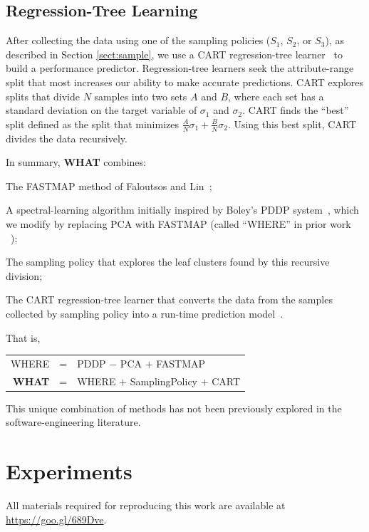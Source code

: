 \documentclass{newsig}
\newcommand{\what}{{\bf WHAT }}
\begin{document}
\subsection{Regression-Tree Learning}
After collecting the data using one of the sampling policies ($S_1$, $S_2$, or $S_3$), as described in Section \ref{sect:sample}, we  use a CART regression-tree learner~\cite{breiman1984} to build a performance predictor. Regression-tree learners seek the attribute-range split that most increases
our ability to make accurate predictions.
CART explores splits that divide $N$ samples  into two sets  $A$ and $B$, where each set  has a  standard deviation on the target variable of $\sigma_1$ and  $\sigma_2$.
CART finds the ``best'' split defined as the split that minimizes $\frac{A}{N}\sigma_1 + \frac{B}{N}\sigma_2$.
Using this best split, CART divides the data recursively.

In summary, \what  combines:
\begin{compactitem}
\item
The FASTMAP method of Faloutsos and Lin~\cite{Faloutsos1995};

\item A spectral-learning algorithm initially   inspired by    Boley's PDDP system~\cite{boley98}, which we modify
by replacing  PCA with FASTMAP (called
``WHERE'' in prior work ~\cite{me12d});

\item
The sampling policy that explores the leaf clusters found by this recursive division;

\item 
The CART regression-tree learner that converts the data from the samples collected by sampling policy 
into a run-time prediction model~\cite{breiman1984}.
\end{compactitem}
That is,
\begin{center}
\begin{tabular}{rcl}
WHERE& = &PDDP $-$ PCA $+$ FASTMAP\\[1.5ex] 
\what& =  & WHERE $+$ SamplingPolicy $+$ CART
\end{tabular}
\end{center}
This unique combination of methods has not been previously explored in the
software-engineering literature.

\section{Experiments}
\label{sec:experiments}
All materials required for reproducing this work are available at \url{https://goo.gl/689Dve}.
\end{document}
